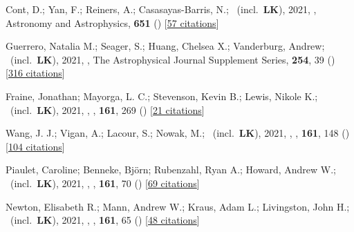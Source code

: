 \item[{\color{numcolor}\scriptsize54}] Cont, D.; Yan, F.; Reiners, A.; Casasayas-Barris, N.; \etal\ (incl.\ \textbf{LK}), 2021, , Astronomy and Astrophysics, \textbf{651} () [\href{https://ui.adsabs.harvard.edu/abs/2021A&A...651A..33C}{57 citations}]

\item[{\color{numcolor}\scriptsize53}] Guerrero, Natalia M.; Seager, S.; Huang, Chelsea X.; Vanderburg, Andrew; \etal\ (incl.\ \textbf{LK}), 2021, , The Astrophysical Journal Supplement Series, \textbf{254}, 39 () [\href{https://ui.adsabs.harvard.edu/abs/2021ApJS..254...39G}{316 citations}]

\item[{\color{numcolor}\scriptsize52}] Fraine, Jonathan; Mayorga, L. C.; Stevenson, Kevin B.; Lewis, Nikole K.; \etal\ (incl.\ \textbf{LK}), 2021, , \aj, \textbf{161}, 269 () [\href{https://ui.adsabs.harvard.edu/abs/2021AJ....161..269F}{21 citations}]

\item[{\color{numcolor}\scriptsize51}] Wang, J. J.; Vigan, A.; Lacour, S.; Nowak, M.; \etal\ (incl.\ \textbf{LK}), 2021, , \aj, \textbf{161}, 148 () [\href{https://ui.adsabs.harvard.edu/abs/2021AJ....161..148W}{104 citations}]

\item[{\color{numcolor}\scriptsize50}] Piaulet, Caroline; Benneke, Bj{\"o}rn; Rubenzahl, Ryan A.; Howard, Andrew W.; \etal\ (incl.\ \textbf{LK}), 2021, , \aj, \textbf{161}, 70 () [\href{https://ui.adsabs.harvard.edu/abs/2021AJ....161...70P}{69 citations}]

\item[{\color{numcolor}\scriptsize49}] Newton, Elisabeth R.; Mann, Andrew W.; Kraus, Adam L.; Livingston, John H.; \etal\ (incl.\ \textbf{LK}), 2021, , \aj, \textbf{161}, 65 () [\href{https://ui.adsabs.harvard.edu/abs/2021AJ....161...65N}{48 citations}]

